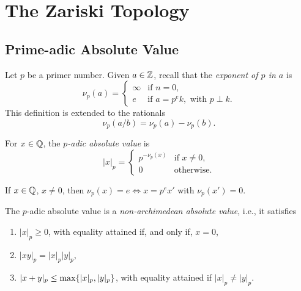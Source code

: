 \chapter{The Zariski Topology}

\section{Prime-adic Absolute Value}

Let $p$ be a primer number. Given $a\in\mathbb{Z}$, recall that the \textsl{exponent of\/ $p$ in\/ $a$} is
$$
    \nu_p(a) = \begin{cases}
        \infty   &\text{if }n=0,\\
        e   &\text{if }a=p^ek,\text{ with }p\perp k.
    \end{cases}
$$
This definition is extended to the rationals
$$
    \nu_p(a/b)=\nu_p(a)-\nu_p(b).
$$

\begin{defn}
    For $x\in\mathbb{Q}$, the \textsl{$p$-adic absolute value} is
    $$
        |x|_p = \begin{cases}
            p^{-\nu_p(x)}   &\text{if } x\ne0,\\
            0   &\text{otherwise}.
        \end{cases}
    $$
\end{defn}

\begin{rem}
    If $x\in\mathbb{Q}$, $x\ne0$, then $\nu_p(x)=e\iff x=p^ex'$ with $\nu_p(x')=0$.
\end{rem}

\begin{thm}
    The\/ $p$-adic absolute value is a \textsl{non-archimedean absolute value}, i.e., it satisfies
    \begin{enumerate}[\rm a)]
        \item $|x|_p\ge0$, with equality attained if, and only if, $x=0$,
        \item $|xy|_p=|x|_p|y|_p$,
        \item $|x+y|_p\le\max\{|x|_p,|y|_p\}$, with equality attained if $|x|_p\ne|y|_p$.
    \end{enumerate}
\end{thm}

